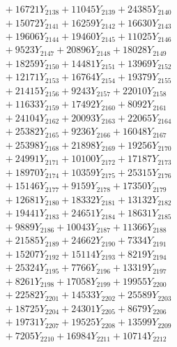 \documentclass[a4paper,10pt]{article}
\begin{document}
{\begin{align}
&\;  + 16721 Y_{2138} + 11045 Y_{2139} + 24385 Y_{2140} \\[0.3ex]
&\;  + 15072 Y_{2141} + 16259 Y_{2142} + 16630 Y_{2143} \\[0.3ex]
&\;  + 19606 Y_{2144} + 19460 Y_{2145} + 11025 Y_{2146} \\[0.3ex]
&\;  + 9523 Y_{2147} + 20896 Y_{2148} + 18028 Y_{2149} \\[0.3ex]
&\;  + 18259 Y_{2150} + 14481 Y_{2151} + 13969 Y_{2152} \\[0.3ex]
&\;  + 12171 Y_{2153} + 16764 Y_{2154} + 19379 Y_{2155} \\[0.3ex]
&\;  + 21415 Y_{2156} + 9243 Y_{2157} + 22010 Y_{2158} \\[0.5ex]\allowbreak
&\;  + 11633 Y_{2159} + 17492 Y_{2160} + 8092 Y_{2161} \\[0.3ex]
&\;  + 24104 Y_{2162} + 20093 Y_{2163} + 22065 Y_{2164} \\[0.3ex]
&\;  + 25382 Y_{2165} + 9236 Y_{2166} + 16048 Y_{2167} \\[0.3ex]
&\;  + 25398 Y_{2168} + 21898 Y_{2169} + 19256 Y_{2170} \\[0.3ex]
&\;  + 24991 Y_{2171} + 10100 Y_{2172} + 17187 Y_{2173} \\[0.3ex]
&\;  + 18970 Y_{2174} + 10359 Y_{2175} + 25315 Y_{2176} \\[0.3ex]
&\;  + 15146 Y_{2177} + 9159 Y_{2178} + 17350 Y_{2179} \\[0.3ex]
&\;  + 12681 Y_{2180} + 18332 Y_{2181} + 13132 Y_{2182} \\[0.3ex]
&\;  + 19441 Y_{2183} + 24651 Y_{2184} + 18631 Y_{2185} \\[0.3ex]
&\;  + 9889 Y_{2186} + 10043 Y_{2187} + 11366 Y_{2188} \\[0.5ex]\allowbreak
&\;  + 21585 Y_{2189} + 24662 Y_{2190} + 7334 Y_{2191} \\[0.3ex]
&\;  + 15207 Y_{2192} + 15114 Y_{2193} + 8219 Y_{2194} \\[0.3ex]
&\;  + 25324 Y_{2195} + 7766 Y_{2196} + 13319 Y_{2197} \\[0.3ex]
&\;  + 8261 Y_{2198} + 17058 Y_{2199} + 19955 Y_{2200} \\[0.3ex]
&\;  + 22582 Y_{2201} + 14533 Y_{2202} + 25589 Y_{2203} \\[0.3ex]
&\;  + 18725 Y_{2204} + 24301 Y_{2205} + 8679 Y_{2206} \\[0.3ex]
&\;  + 19731 Y_{2207} + 19525 Y_{2208} + 13599 Y_{2209} \\[0.3ex]
&\;  + 7205 Y_{2210} + 16984 Y_{2211} + 10714 Y_{2212} \\[0.3ex]

\end{align}}
\end{document}
